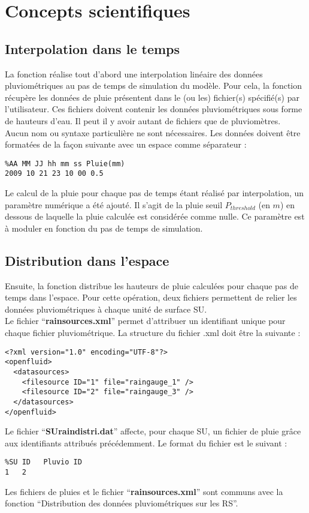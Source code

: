 \section{Concepts scientifiques}
\subsection{Interpolation dans le temps}
La fonction réalise tout d'abord une interpolation linéaire des données pluviométriques au pas de temps de simulation du modèle. Pour cela, la fonction récupère les données de pluie présentent dans le (ou les) fichier(s) spécifié(s) par l'utilisateur. Ces fichiers doivent contenir les données pluviométriques sous forme de hauteurs d'eau. Il peut il y avoir autant de fichiers que de pluviomètres. Aucun nom ou syntaxe particulière ne sont nécessaires. Les données doivent être formatées de la façon suivante avec un espace comme séparateur :

\begin{verbatim}
%AA MM JJ hh mm ss Pluie(mm)
2009 10 21 23 10 00 0.5
\end{verbatim}

Le calcul de la pluie pour chaque pas de temps étant réalisé par interpolation, un paramètre numérique a été ajouté. Il s'agit de la pluie seuil $P_{threshold}$ (en $m$) en dessous de laquelle la pluie calculée est considérée comme nulle. Ce paramètre est à moduler en fonction du pas de temps de simulation.


\subsection{Distribution dans l'espace}
Ensuite, la fonction distribue les hauteurs de pluie calculées pour chaque pas de temps dans l'espace. Pour cette opération, deux fichiers permettent de relier les données pluviométriques à chaque unité de surface SU.\\

Le fichier ``\textbf{rainsources.xml}'' permet d'attribuer un identifiant unique pour chaque fichier pluviométrique. La structure du fichier .xml doit être la suivante :

\begin{verbatim}
<?xml version="1.0" encoding="UTF-8"?>
<openfluid>
  <datasources>
    <filesource ID="1" file="raingauge_1" />
    <filesource ID="2" file="raingauge_3" />
  </datasources>
</openfluid>
\end{verbatim}

Le fichier ``\textbf{SUraindistri.dat}'' affecte, pour chaque SU, un fichier de pluie grâce aux identifiants attribués précédemment. Le format du fichier est le suivant :

\begin{verbatim}
%SU ID   Pluvio ID
1   2
\end{verbatim}

Les fichiers de pluies et le fichier ``\textbf{rainsources.xml}'' sont communs avec la fonction ``Distribution des données pluviométriques sur les RS''.
